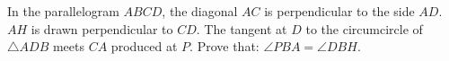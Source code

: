 In the parallelogram $ABCD$, the diagonal $AC$ is perpendicular to the side $AD$. $AH$ is drawn perpendicular to $CD$. The tangent at $D$ to the circumcircle of $\triangle ADB$ meets $CA$ produced at $P$. Prove that: $\angle PBA = \angle DBH$.
